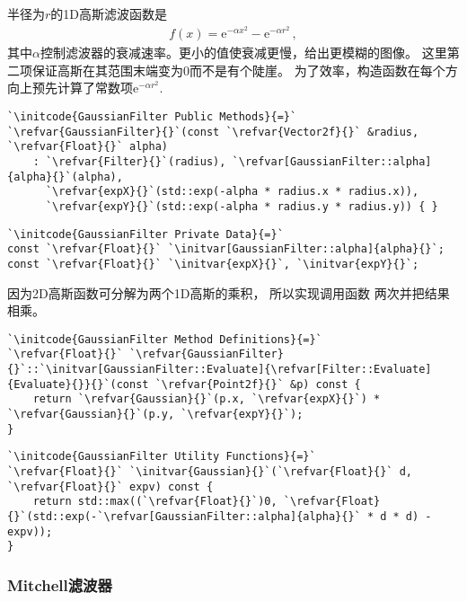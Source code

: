 半径为$r$的1D高斯滤波函数是
\begin{align*}
    f(x)={\mathrm{e}}^{-\alpha x^2}-{\mathrm{e}}^{-\alpha r^2}\, ,
\end{align*}
其中$\alpha$控制滤波器的衰减速率。更小的值使衰减更慢，给出更模糊的图像。
这里第二项保证高斯在其范围末端变为0而不是有个陡崖。
为了效率，构造函数在每个方向上预先计算了常数项${\mathrm{e}}^{-\alpha r^2}$.
\begin{lstlisting}
`\initcode{GaussianFilter Public Methods}{=}`
`\refvar{GaussianFilter}{}`(const `\refvar{Vector2f}{}` &radius, `\refvar{Float}{}` alpha)
    : `\refvar{Filter}{}`(radius), `\refvar[GaussianFilter::alpha]{alpha}{}`(alpha),
      `\refvar{expX}{}`(std::exp(-alpha * radius.x * radius.x)),
      `\refvar{expY}{}`(std::exp(-alpha * radius.y * radius.y)) { }
\end{lstlisting}
\begin{lstlisting}
`\initcode{GaussianFilter Private Data}{=}`
const `\refvar{Float}{}` `\initvar[GaussianFilter::alpha]{alpha}{}`;
const `\refvar{Float}{}` `\initvar{expX}{}`, `\initvar{expY}{}`;
\end{lstlisting}

因为2D高斯函数可分解为两个1D高斯的乘积，
所以实现调用函数
两次并把结果相乘。
\begin{lstlisting}
`\initcode{GaussianFilter Method Definitions}{=}`
`\refvar{Float}{}` `\refvar{GaussianFilter}{}`::`\initvar[GaussianFilter::Evaluate]{\refvar[Filter::Evaluate]{Evaluate}{}}{}`(const `\refvar{Point2f}{}` &p) const {
    return `\refvar{Gaussian}{}`(p.x, `\refvar{expX}{}`) * `\refvar{Gaussian}{}`(p.y, `\refvar{expY}{}`);
}
\end{lstlisting}
\begin{lstlisting}
`\initcode{GaussianFilter Utility Functions}{=}`
`\refvar{Float}{}` `\initvar{Gaussian}{}`(`\refvar{Float}{}` d, `\refvar{Float}{}` expv) const {
    return std::max((`\refvar{Float}{}`)0, `\refvar{Float}{}`(std::exp(-`\refvar[GaussianFilter::alpha]{alpha}{}` * d * d) - expv));
}
\end{lstlisting}

\subsubsection*{Mitchell滤波器}